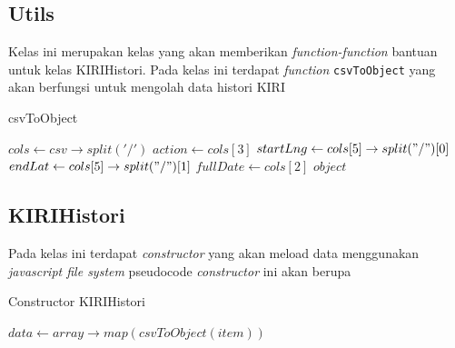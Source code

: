 \subsection{Utils}
Kelas ini merupakan kelas yang akan memberikan \textit{function-function} bantuan untuk kelas KIRIHistori.
Pada kelas ini terdapat \textit{function} \texttt{csvToObject} yang akan berfungsi untuk mengolah data histori KIRI 
\begin{algorithm}[H]
\caption{csvToObject}
\label{psudo:constructorKIRIHistori}
    \begin{algorithmic}[1]
        \STATE $cols \leftarrow csv \rightarrow split('/')$
        \STATE $action \leftarrow cols[3]$
                \STATE $startLng \leftarrow cols[5]\rightarrow split("/")[0]$
                \STATE $endLat \leftarrow cols[5]\rightarrow split("/")[1]$
                \STATE $fullDate \leftarrow cols[2]$
                \RETURN ${object}$
       \ENDIF
    \end{algorithmic}
\end{algorithm}


\subsection{KIRIHistori}
Pada kelas ini terdapat \textit{constructor} yang akan meload data menggunakan \textit{javascript file system} pseudocode \textit{constructor} ini akan berupa
\begin{algorithm}[H]
\caption{Constructor KIRIHistori}
    \begin{algorithmic}[1]
        \STATE $data \leftarrow array \rightarrow map(csvToObject(item))$
    \end{algorithmic}
\end{algorithm}


